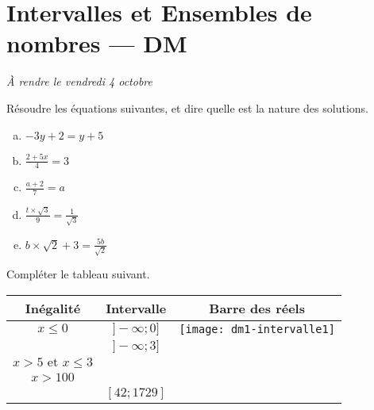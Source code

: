\documentclass[12pt]{article}
\begin{document}
  \section*{Intervalles et Ensembles de nombres --- DM}
  \emph{À rendre le vendredi 4 octobre}
  \setcounter{exercice}{0}

  \begin{exercice}
    Résoudre les équations suivantes, et dire quelle est la nature des solutions.
    \begin{enumerate}[(a)]
      \item $-3y+2=y+5$
      \item $\frac{2+5x}{4} = 3$
      \item $\frac{a+2}{7}=a$
      \item $\frac{t\times\sqrt{3}}{9}=\frac{1}{\sqrt{3}}$
      \item $b\times\sqrt{2}+3=\frac{5b}{\sqrt{2}}$
    \end{enumerate}
  \end{exercice}

  \begin{exercice}[Intervalles]
    Compléter le tableau suivant.

    \def\arraystretch{2}%
      \begin{tabular}{c|c|c}
        Inégalité & Intervalle & Barre des réels \\
        \hline\hline
    $x\leq0$ & $]-\infty;0]$       & \texttt{[image: dm1-intervalle1]} \\
        \hline
    & $]-\infty;3]$ & \\
        \hline
        $x>5 \text{ et } x\leq3$ && \\
        \hline
        $x>100$ && \\
        \hline
              & $[42; 1729]$&\\
      \end{tabular}
  \end{exercice}

  \newpage
\end{document}
